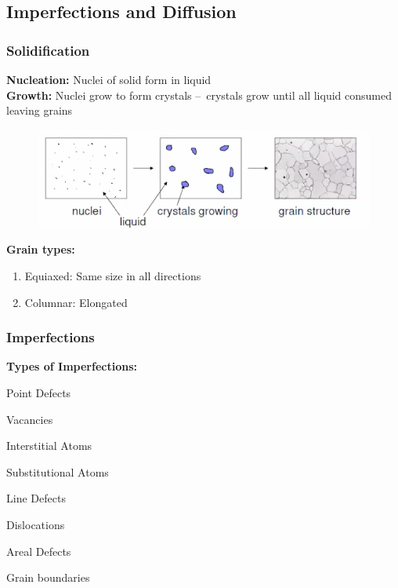 \documentclass{article}
\newcommand{\SubItem}[1]{
    {\setlength\itemindent{15pt} \item[-] #1}
}
\begin{document}
    \subsection{Imperfections and Diffusion}
    \subsubsection{Solidification}
        \textbf{Nucleation:} Nuclei of solid form in liquid \\
        \textbf{Growth:} Nuclei grow to form crystals – crystals grow until all liquid consumed leaving grains  
    \begin{figure}[H]
        \centering
        \includegraphics[width=\textwidth]{images/solidification.png}
    \end{figure}
    \textbf{Grain types:}
    \begin{enumerate}
        \item Equiaxed: Same size in all directions
        \item Columnar: Elongated
    \end{enumerate}

    \subsubsection{Imperfections}
    \textbf{Types of Imperfections:}
    \begin{enumerate}
        \item Point Defects
            \SubItem{Vacancies} 
            \SubItem{Interstitial Atoms}
            \SubItem{Substitutional Atoms}
        \item Line Defects
            \SubItem{Dislocations}
        \item Areal Defects
            \SubItem{Grain boundaries}
    \end{enumerate}
\end{document}
